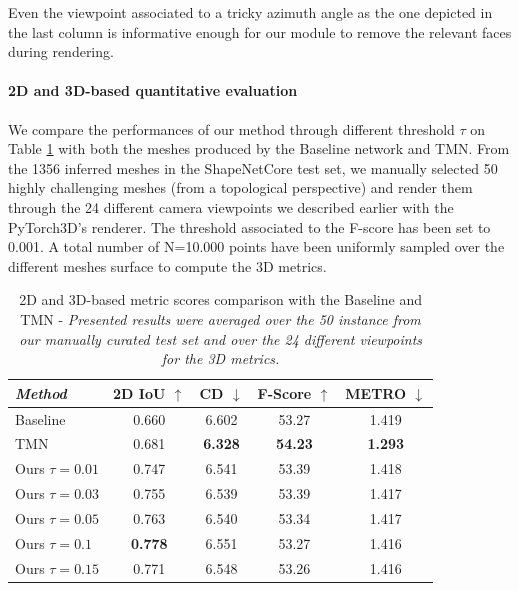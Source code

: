 Even the viewpoint associated to a tricky azimuth angle as the one depicted in the last column is informative enough for our module to remove the relevant faces during rendering.

\paragraph{2D and 3D-based quantitative evaluation}

We compare the performances of our method through different threshold $\tau$ on Table \ref{tab:sota_table} with both the meshes produced by the Baseline network and TMN\citep{pan2019deep}. From the 1356 inferred meshes in the ShapeNetCore\citep{chang2015shapenet} test set, we manually selected 50 highly challenging meshes (from a topological perspective) and render them through the 24 different camera viewpoints we described earlier with the PyTorch3D's renderer. The threshold associated to the F-score has been set to 0.001. A total number of N=10.000 points have been uniformly sampled over the different meshes surface to compute the 3D metrics. 

\begin{table}[htp!]
\begin{center}
\caption{2D and 3D-based metric scores comparison with the Baseline and TMN\citep{pan2019deep} - \textit{Presented results were averaged over the 50 instance from our manually curated test set and over the 24 different viewpoints for the 3D metrics.}} 
\label{tab:sota_table}

\begin{tabular}{|l|c|c|c|c|}
\hline
\textit{Method} & 2D IoU $\uparrow$   & CD $\downarrow$  &F-Score $\uparrow$ & METRO $\downarrow$ \\ 
 \hline\hline
Baseline & 0.660  &  6.602  & 53.27  &  1.419      \\ 
\hline
TMN\citep{pan2019deep} & 0.681  & \textbf{6.328}   & \textbf{54.23}  & \textbf{1.293} \\ 
\hline
Ours $\scriptstyle \tau=0.01$ & 0.747 & 6.541  &  53.39 &  1.418      \\
\hline
Ours $\scriptstyle \tau=0.03$ & 0.755 &6.539  & 53.39  &    1.417  \\
\hline
Ours $\scriptstyle \tau=0.05$ & 0.763 & 6.540  &   53.34 &   1.417     \\
\hline
Ours $\scriptstyle \tau=0.1$ & \textbf{0.778} & 6.551  & 53.27 &  1.416     \\
\hline
Ours $\scriptstyle \tau=0.15$ & 0.771 & 6.548  & 53.26  &    1.416   \\
\hline

%
\end{tabular}
\end{center}

\end{table}


